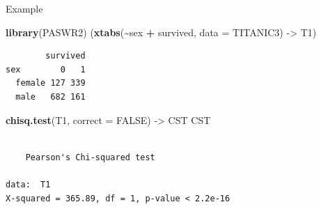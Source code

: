 \documentclass[
  ignorenonframetext,
]{beamer}
\newenvironment{Shaded}{\begin{snugshade}}{\end{snugshade}}
\newcommand{\AttributeTok}[1]{\textcolor[rgb]{0.13,0.29,0.53}{#1}}
\newcommand{\ConstantTok}[1]{\textcolor[rgb]{0.56,0.35,0.01}{#1}}
\newcommand{\FunctionTok}[1]{\textcolor[rgb]{0.13,0.29,0.53}{\textbf{#1}}}
\newcommand{\NormalTok}[1]{#1}
\newcommand{\OtherTok}[1]{\textcolor[rgb]{0.56,0.35,0.01}{#1}}
\newcommand{\SpecialCharTok}[1]{\textcolor[rgb]{0.81,0.36,0.00}{\textbf{#1}}}
\begin{document}
\begin{frame}[fragile]{Example}
\label{example}
\begin{Shaded}
\begin{Highlighting}[]
\FunctionTok{library}\NormalTok{(PASWR2)}
\NormalTok{(}\FunctionTok{xtabs}\NormalTok{(}\SpecialCharTok{\textasciitilde{}}\NormalTok{sex }\SpecialCharTok{+}\NormalTok{ survived, }\AttributeTok{data =}\NormalTok{ TITANIC3) }\OtherTok{{-}\textgreater{}}\NormalTok{ T1)}
\end{Highlighting}
\end{Shaded}

\begin{verbatim}
        survived
sex        0   1
  female 127 339
  male   682 161
\end{verbatim}

\begin{Shaded}
\begin{Highlighting}[]
\FunctionTok{chisq.test}\NormalTok{(T1, }\AttributeTok{correct =} \ConstantTok{FALSE}\NormalTok{) }\OtherTok{{-}\textgreater{}}\NormalTok{ CST}
\NormalTok{CST}
\end{Highlighting}
\end{Shaded}

\begin{verbatim}

    Pearson's Chi-squared test

data:  T1
X-squared = 365.89, df = 1, p-value < 2.2e-16
\end{verbatim}
\end{frame}
\end{document}
